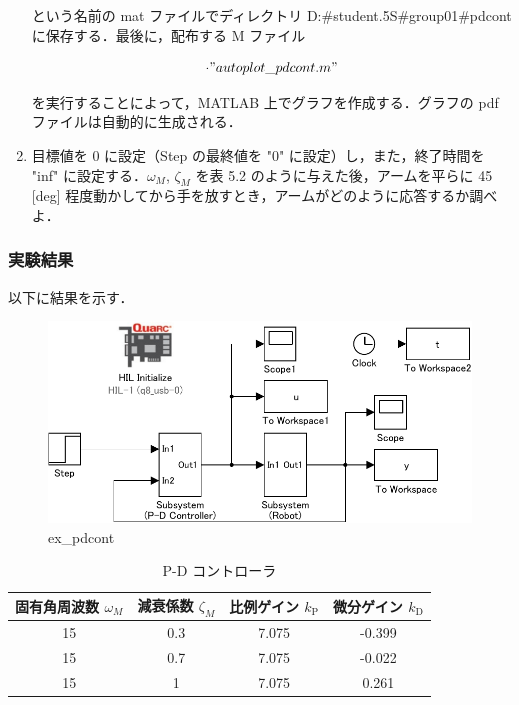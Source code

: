 \begin{enumerate}
        という名前の mat ファイルでディレクトリ D:\#student.5S\#group01\#pdcont に保存する．最後に，配布する M ファイル
        
        \begin{equation}
          \cdot "autoplot\_pdcont.m"
        \end{equation}
        
        を実行することによって，MATLAB 上でグラフを作成する．グラフの pdf ファイルは自動的に生成される．
        
  \item 目標値を 0 に設定（Step の最終値を "0" に設定）し，また，終了時間を "inf" に設定する．$\omega_M$, $\zeta_M$ を表 5.2 のように与えた後，アームを平らに 45 [deg] 程度動かしてから手を放すとき，アームがどのように応答するか調べよ．
\end{enumerate}


\subsubsection{実験結果}
以下に結果を示す．

\begin{figure}[h]
  \centering
  \includegraphics[scale=1]{sozai/ex_pdcont-crop.pdf}
  \caption{ex\_pdcont}
\end{figure}

\begin{table}[h]
  \centering
  \caption{P-D コントローラ}
  \begin{tabular}{|c|c|c|c|}
    \hline
    固有角周波数 $\omega_M$ & 減衰係数 $\zeta_M$ & 比例ゲイン $k_{\mathrm{P}}$ & 微分ゲイン $k_{\mathrm{D}}$ \\
    \hline
    15                      & 0.3                & 7.075                       & -0.399                      \\
    15                      & 0.7                & 7.075                       & -0.022                      \\
    15                      & 1                  & 7.075                       & 0.261                       \\
    \hline
  \end{tabular}
\end{table}


